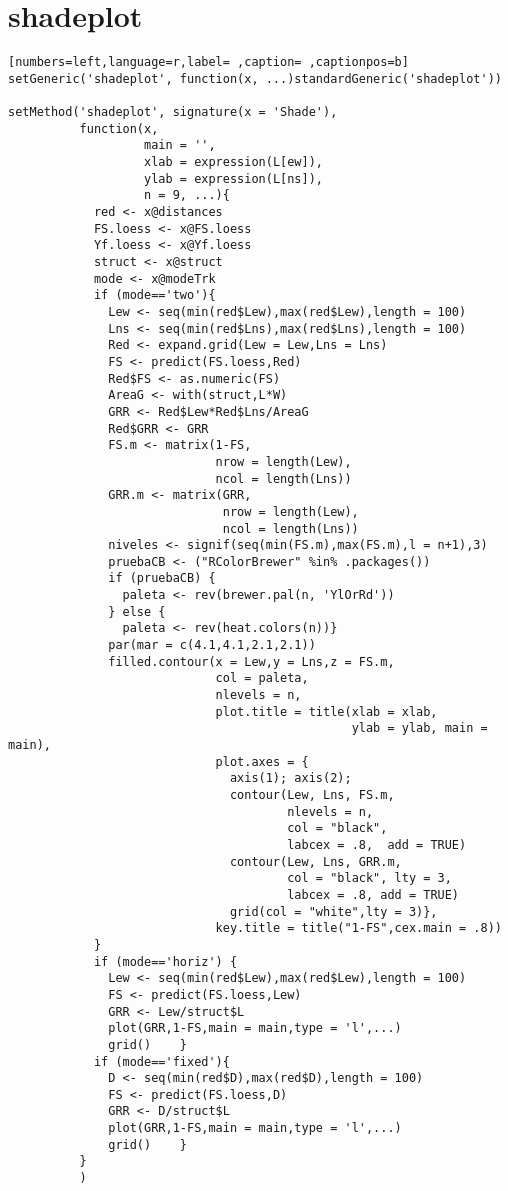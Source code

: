 \section{shadeplot}
\label{sec:orgc3c11ef}
\begin{lstlisting}[numbers=left,language=r,label= ,caption= ,captionpos=b]
setGeneric('shadeplot', function(x, ...)standardGeneric('shadeplot'))

setMethod('shadeplot', signature(x = 'Shade'),
          function(x,
                   main = '',
                   xlab = expression(L[ew]),
                   ylab = expression(L[ns]),
                   n = 9, ...){
            red <- x@distances
            FS.loess <- x@FS.loess
            Yf.loess <- x@Yf.loess
            struct <- x@struct
            mode <- x@modeTrk
            if (mode=='two'){
              Lew <- seq(min(red$Lew),max(red$Lew),length = 100)
              Lns <- seq(min(red$Lns),max(red$Lns),length = 100)
              Red <- expand.grid(Lew = Lew,Lns = Lns)
              FS <- predict(FS.loess,Red)
              Red$FS <- as.numeric(FS)
              AreaG <- with(struct,L*W)
              GRR <- Red$Lew*Red$Lns/AreaG
              Red$GRR <- GRR
              FS.m <- matrix(1-FS,
                             nrow = length(Lew),
                             ncol = length(Lns))
              GRR.m <- matrix(GRR,
                              nrow = length(Lew),
                              ncol = length(Lns))
              niveles <- signif(seq(min(FS.m),max(FS.m),l = n+1),3)
              pruebaCB <- ("RColorBrewer" %in% .packages())
              if (pruebaCB) {
                paleta <- rev(brewer.pal(n, 'YlOrRd'))
              } else {
                paleta <- rev(heat.colors(n))}
              par(mar = c(4.1,4.1,2.1,2.1)) 
              filled.contour(x = Lew,y = Lns,z = FS.m,
                             col = paleta, 
                             nlevels = n,
                             plot.title = title(xlab = xlab,
                                                ylab = ylab, main = main),
                             plot.axes = {
                               axis(1); axis(2);
                               contour(Lew, Lns, FS.m,
                                       nlevels = n, 
                                       col = "black",
                                       labcex = .8,  add = TRUE)
                               contour(Lew, Lns, GRR.m,
                                       col = "black", lty = 3,
                                       labcex = .8, add = TRUE)
                               grid(col = "white",lty = 3)},
                             key.title = title("1-FS",cex.main = .8))
            }
            if (mode=='horiz') {
              Lew <- seq(min(red$Lew),max(red$Lew),length = 100)
              FS <- predict(FS.loess,Lew)
              GRR <- Lew/struct$L
              plot(GRR,1-FS,main = main,type = 'l',...)
              grid()    }
            if (mode=='fixed'){
              D <- seq(min(red$D),max(red$D),length = 100)
              FS <- predict(FS.loess,D)
              GRR <- D/struct$L
              plot(GRR,1-FS,main = main,type = 'l',...)
              grid()    }
          }
          )
\end{lstlisting}
